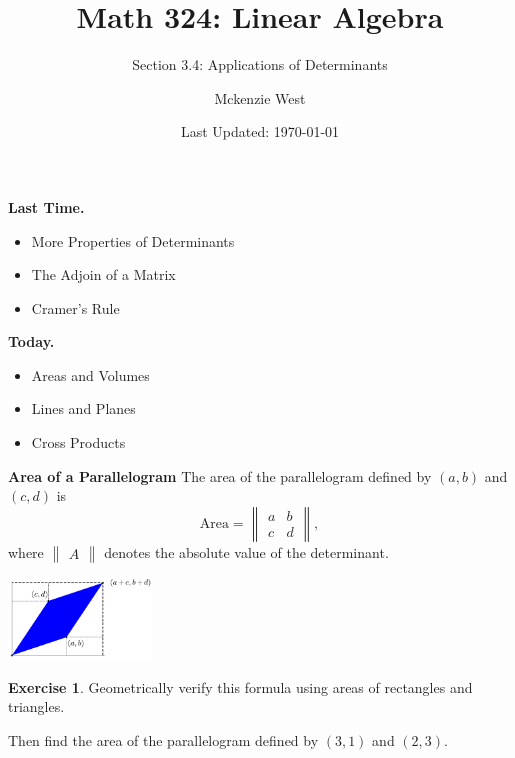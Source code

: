 \documentclass{beamer}
\newcommand{\fn}{\insertframenumber}
\theoremstyle{definition}
\newtheorem{exercise}{Exercise}
\begin{document}
	\title{Math 324: Linear Algebra}
	\subtitle{Section 3.4: Applications of Determinants}
	\author{Mckenzie West}
	\date{Last Updated: \today}
\begin{frame}
\maketitle
\end{frame}

\begin{frame}{\insertframenumber}
	\begin{block}{\textbf{Last Time.}}
	\begin{itemize}[label=--]
		\item More Properties of Determinants
		\item The Adjoin of a Matrix
		\item Cramer's Rule
	\end{itemize}
	\end{block}
	\begin{block}{\textbf{Today.}}
		\begin{itemize}[label=--]
			\item Areas and Volumes
			\item Lines and Planes
			\item Cross Products
		\end{itemize}
	\end{block}
\end{frame}

\begin{frame}{\fn}
	\begin{block}{\textbf{Area of a Parallelogram}}
			The area of the parallelogram defined by $(a,b)$ and $(c,d)$ is	
			\[\text{Area}=\begin{Vmatrix}a&b\\c&d\end{Vmatrix},\]
			where $\begin{Vmatrix}A\end{Vmatrix}$ denotes the absolute value of the determinant.
			\begin{center}
			\includegraphics[width=1.5in]{images/parallelogram}
			\end{center}
	\end{block}
	\begin{exercise}
		Geometrically verify this formula using areas of rectangles and triangles.
		
		Then find the area of the parallelogram defined by $(3,1)$ and $(2,3)$.
	\end{exercise}
\end{frame}
\end{document}

